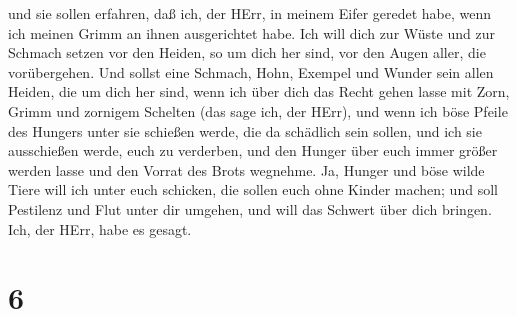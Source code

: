 und sie sollen erfahren, daß ich, der HErr, in meinem Eifer geredet
habe, wenn ich meinen Grimm an ihnen ausgerichtet habe. 
Ich will dich zur Wüste und zur Schmach setzen vor den Heiden, so um
dich her sind, vor den Augen aller, die vorübergehen.  Und
sollst eine Schmach, Hohn, Exempel und Wunder sein allen Heiden, die um
dich her sind, wenn ich über dich das Recht gehen lasse mit Zorn, Grimm
und zornigem Schelten (das sage ich, der HErr),  und wenn
ich böse Pfeile des Hungers unter sie schießen werde, die da schädlich
sein sollen, und ich sie ausschießen werde, euch zu verderben, und den
Hunger über euch immer größer werden lasse und den Vorrat des Brots
wegnehme.  Ja, Hunger und böse wilde Tiere will ich unter
euch schicken, die sollen euch ohne Kinder machen; und soll Pestilenz
und Flut unter dir umgehen, und will das Schwert über dich bringen. Ich,
der HErr, habe es gesagt.

\hypertarget{section-5}{%
\section{6}\label{section-5}}

